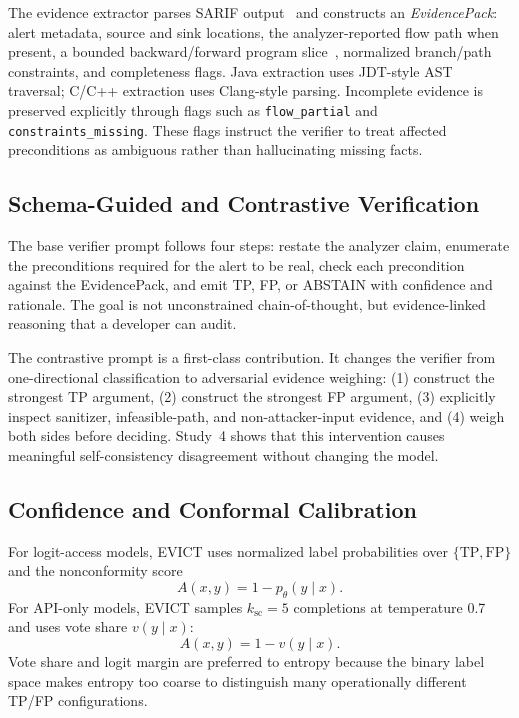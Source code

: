 The evidence extractor parses SARIF output~\cite{sarif2020} and constructs an \emph{EvidencePack}: alert metadata, source and sink locations, the analyzer-reported flow path when present, a bounded backward/forward program slice~\cite{weiser1984}, normalized branch/path constraints, and completeness flags. Java extraction uses JDT-style AST traversal; C/C++ extraction uses Clang-style parsing. Incomplete evidence is preserved explicitly through flags such as \texttt{flow\_partial} and \texttt{constraints\_missing}. These flags instruct the verifier to treat affected preconditions as ambiguous rather than hallucinating missing facts.

\subsection{Schema-Guided and Contrastive Verification}

The base verifier prompt follows four steps: restate the analyzer claim, enumerate the preconditions required for the alert to be real, check each precondition against the EvidencePack, and emit TP, FP, or ABSTAIN with confidence and rationale. The goal is not unconstrained chain-of-thought, but evidence-linked reasoning that a developer can audit.

The contrastive prompt is a first-class contribution. It changes the verifier from one-directional classification to adversarial evidence weighing: (1) construct the strongest TP argument, (2) construct the strongest FP argument, (3) explicitly inspect sanitizer, infeasible-path, and non-attacker-input evidence, and (4) weigh both sides before deciding. Study~4 shows that this intervention causes meaningful self-consistency disagreement without changing the model.

\subsection{Confidence and Conformal Calibration}

For logit-access models, EVICT uses normalized label probabilities over $\{\mathrm{TP},\mathrm{FP}\}$ and the nonconformity score
\begin{equation}
A(x,y)=1-p_\theta(y\mid x).
\end{equation}
For API-only models, EVICT samples $k_{\mathrm{sc}}=5$ completions at temperature 0.7 and uses vote share $v(y\mid x)$:
\begin{equation}
A(x,y)=1-v(y\mid x).
\end{equation}
Vote share and logit margin are preferred to entropy because the binary label space makes entropy too coarse to distinguish many operationally different TP/FP configurations.

